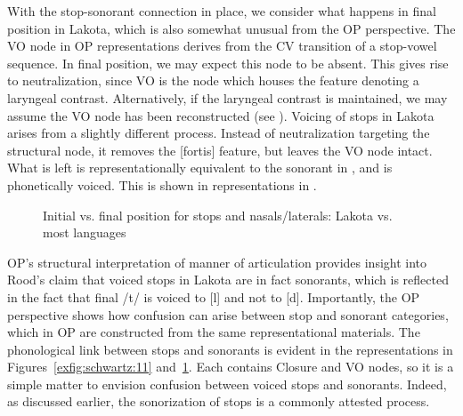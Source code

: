 \documentclass[output=paper]{langscibook}
\begin{document}
With the stop-sonorant connection in place, we consider what happens in final position in Lakota, which is also somewhat unusual from the OP perspective. The VO node in OP representations derives from the CV transition of a stop-vowel sequence. In final position, we may expect this node to be absent. This gives rise to neutralization, since VO is the node which houses the feature denoting a laryngeal contrast. Alternatively, if the laryngeal contrast is maintained, we may assume the VO node has been reconstructed (see \citealt{SchwartzEtAl2021}). Voicing of stops in Lakota arises from a slightly different process. Instead of neutralization targeting the structural node, it removes the [fortis] feature, but leaves the VO node intact. What is left is representationally equivalent to the sonorant in , and is phonetically voiced. This is shown in representations in .

\begin{figure}
\caption{\label{exfig:schwartz:12}Initial vs. final position for stops and nasals/laterals: Lakota vs. most languages}
\end{figure}
 

OP’s structural interpretation of manner of articulation provides insight into Rood’s claim that voiced stops in Lakota are in fact sonorants, which is reflected in the fact that final /t/ is voiced to [l] and not to [d]. Importantly, the OP perspective shows how confusion can arise between stop and sonorant categories, which in OP are constructed from the same representational materials. The phonological link between stops and sonorants is evident in the representations in Figures~\ref{exfig:schwartz:11} and~\ref{exfig:schwartz:12}. Each contains Closure and VO nodes, so it is a simple matter to envision confusion between voiced stops and sonorants. Indeed, as discussed earlier, the sonorization of stops is a commonly attested process.
\end{document}
